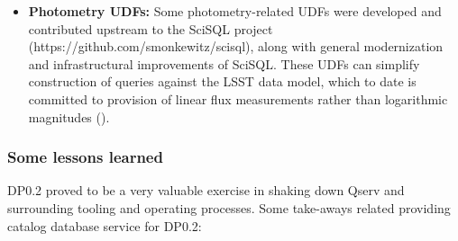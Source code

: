 \begin{itemize}
\item
  \textbf{Photometry UDFs:} Some photometry-related UDFs were developed and contributed upstream to the SciSQL
  project (https://github.com/smonkewitz/scisql), along with general modernization and infrastructural
  improvements of SciSQL.  These UDFs can simplify construction of queries against the LSST data model, which
  to date is committed to provision of linear flux measurements rather than logarithmic magnitudes
  ().

\end{itemize}

\subsubsection{Some lessons learned}

DP0.2 proved to be a very valuable exercise in shaking down Qserv and surrounding tooling and operating
processes.  Some take-aways related providing catalog database service for DP0.2:

